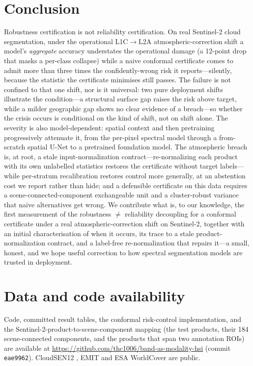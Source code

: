\documentclass[preprint,3p,times]{elsarticle}
\begin{document}
\section{Conclusion}
Robustness certification is not reliability certification. On real Sentinel-2 cloud segmentation, under the operational L1C$\to$L2A atmospheric-correction shift a model's \emph{aggregate} accuracy understates the operational damage (a 12-point drop that masks a per-class collapse) while a naive conformal certificate comes to admit more than three times the confidently-wrong risk it reports---silently, because the statistic the certificate minimises still passes. The failure is not confined to that one shift, nor is it universal: two pure deployment shifts illustrate the condition---a structural surface gap raises the risk above target, while a milder geographic gap shows no clear evidence of a breach---so whether the crisis occurs is conditional on the kind of shift, not on shift alone. The severity is also model-dependent: spatial context and then pretraining progressively attenuate it, from the per-pixel spectral model through a from-scratch spatial U-Net to a pretrained foundation model. The atmospheric breach is, at root, a stale input-normalization contract---re-normalizing each product with its own unlabelled statistics restores the certificate without target labels---while per-stratum recalibration restores control more generally, at an abstention cost we report rather than hide; and a defensible certificate on this data requires a scene-connected-component exchangeable unit and a cluster-robust variance that naive alternatives get wrong. We contribute what is, to our knowledge, the first measurement of the robustness $\neq$ reliability decoupling for a conformal certificate under a real atmospheric-correction shift on Sentinel-2, together with an initial characterisation of when it occurs, its trace to a stale product-normalization contract, and a label-free re-normalization that repairs it---a small, honest, and we hope useful correction to how spectral segmentation models are trusted in deployment.

\section*{Data and code availability}
Code, committed result tables, the conformal risk-control implementation, and the Sentinel-2-product-to-scene-component mapping (the test products, their 184 scene-connected components, and the products that span two annotation ROIs) are available at \url{https://github.com/thc1006/band-as-modality-hsi} (commit \texttt{eae9962}). CloudSEN12 \citep{aybar2022cloudsen12}, EMIT and ESA WorldCover are public.
\end{document}
